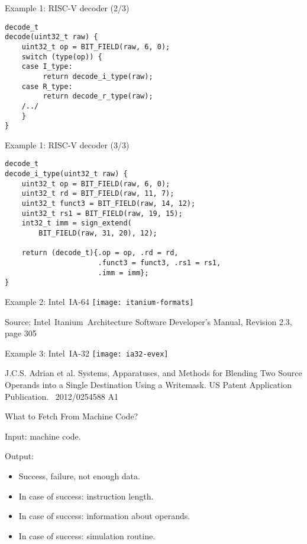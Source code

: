 \begin{frame}[fragile]{Example 1: RISC-V decoder (2/3)}
\begin{lstlisting}
decode_t
decode(uint32_t raw) {
    uint32_t op = BIT_FIELD(raw, 6, 0);
    switch (type(op)) {
    case I_type:
         return decode_i_type(raw);
    case R_type:
         return decode_r_type(raw);
    /../
    }
}
\end{lstlisting}
\end{frame}

\begin{frame}[fragile]{Example 1: RISC-V decoder (3/3)}
\begin{lstlisting}
decode_t
decode_i_type(uint32_t raw) {
    uint32_t op = BIT_FIELD(raw, 6, 0);
    uint32_t rd = BIT_FIELD(raw, 11, 7);
    uint32_t funct3 = BIT_FIELD(raw, 14, 12);
    uint32_t rs1 = BIT_FIELD(raw, 19, 15);
    int32_t imm = sign_extend(
        BIT_FIELD(raw, 31, 20), 12);

    return (decode_t){.op = op, .rd = rd,
                      .funct3 = funct3, .rs1 = rs1,
                      .imm = imm};
}
\end{lstlisting}
\end{frame}

\begin{frame}{Example 2: Intel\reg~IA-64}
\centering
\texttt{[image: itanium-formats]}

\tiny{Source: Intel\reg~Itanium\reg~Architecture Software
      Developer’s Manual, Revision 2.3, page 305}
\end{frame}

\begin{frame}{Example 3: Intel\reg~IA-32}
\centering
\texttt{[image: ia32-evex]}

\tiny{J.C.S. Adrian et al. Systems, Apparatuses, and Methods for Blending Two
      Source Operands into a Single Destination Using a Writemask. US Patent
      Application Publication. \No~2012/0254588 A1}
\end{frame}

\begin{frame}{What to Fetch From Machine Code?}
\begin{centering}
\end{centering}
\vfill
Input: machine code.

Output:
\begin{itemize}
\item Success, failure, not enough data.
\item In case of success: instruction length.
\item In case of success: information about operands.
\item In case of success: simulation routine.
\end{itemize}
\end{frame}

